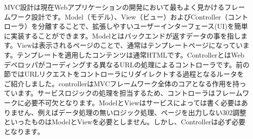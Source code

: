 MVC設計は現在Webアプリケーションの開発において最もよく見かけるフレームワーク設計です。Model（モデル）、View（ビュー）およびController（コントローラ）を分離することで、拡張しやすいユーザーインターフェース(UI)を簡単に実装することができます。Modelとはバックエンドが返すデータの事を指します。Viewは表示されるページのことで、通常はテンプレートページになっています。テンプレートを適用したコンテンツは通常HTMLです。ControllerとはWebデベロッパがコーディングする異なるURLの処理によるコントローラです。前の節ではURLリクエストをコントローラにリダイレクトする過程となるルータをご紹介しました。controllerはMVCフレームワーク全体のコアとなる作用を持っています。サービスロジックの処理を担当するため、コントローラはフレームワークに必要不可欠となります。ModelとViewはサービスによっては書く必要はありません、例えばデータ処理の無いロジック処理、ページを出力しない302調整といったものはModelとViewを必要としません。しかし、Controllerは必ず必要となります。
